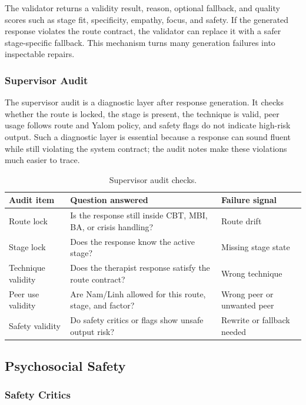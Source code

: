 The validator returns a validity result, reason, optional fallback, and quality scores such as stage fit, specificity, empathy, focus, and safety. If the generated response violates the route contract, the validator can replace it with a safer stage-specific fallback. This mechanism turns many generation failures into inspectable repairs.

\subsubsection{Supervisor Audit}

The supervisor audit is a diagnostic layer after response generation. It checks whether the route is locked, the stage is present, the technique is valid, peer usage follows route and Yalom policy, and safety flags do not indicate high-risk output. Such a diagnostic layer is essential because a response can sound fluent while still violating the system contract; the audit notes make these violations much easier to trace.

\begin{table}[tb]
\centering
\caption{Supervisor audit checks.}
\label{tab:supervisor_audit}
\small
\begin{tabular}{p{}p{}p{}}
\toprule
Audit item & Question answered & Failure signal \\
\midrule
Route lock & Is the response still inside CBT, MBI, BA, or crisis handling? & Route drift \\
Stage lock & Does the response know the active stage? & Missing stage state \\
Technique validity & Does the therapist response satisfy the route contract? & Wrong technique \\
Peer use validity & Are Nam/Linh allowed for this route, stage, and factor? & Wrong peer or unwanted peer \\
Safety validity & Do safety critics or flags show unsafe output risk? & Rewrite or fallback needed \\
\bottomrule
\end{tabular}
\end{table}

\subsection{Psychosocial Safety}
\label{sec:psychosocial_safety}

\subsubsection{Safety Critics}

